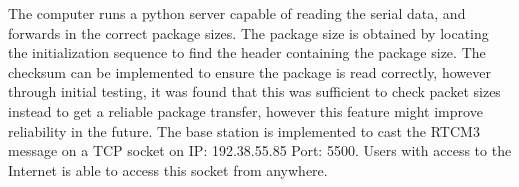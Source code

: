 The computer runs a python server capable of reading the serial data, and forwards in the correct package sizes.
The package size is obtained by locating the initialization sequence to find the header containing the package size.
The checksum can be implemented to ensure the package is read correctly, however through initial testing, it was found that this was sufficient to check packet sizes instead to get a reliable package transfer, however this feature might improve reliability in the future.
The base station is implemented to cast the RTCM3 message on a TCP socket on IP: 192.38.55.85 Port: 5500. 
Users with access to the Internet is able to access this socket from anywhere.

